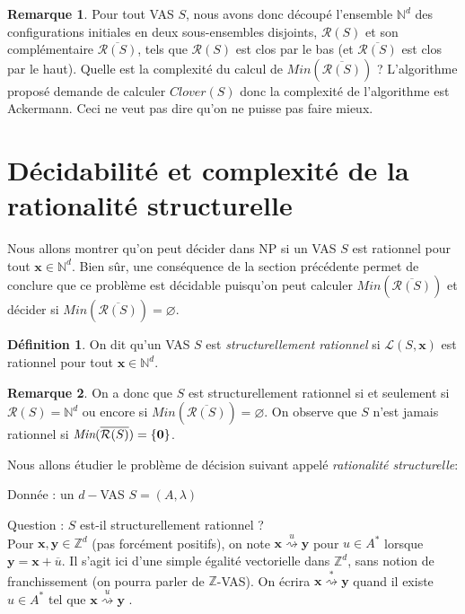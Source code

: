 \documentclass[a4paper,final]{article}
\theoremstyle{definition}
\newtheorem{Definition}[Theorem]{Définition}
\newtheorem*{Remark}{Remarque}
\newcommand{\os}[1]{\left\{\mathinner{#1}\right\}}
\let\vide\varnothing
\newcommand{\Min}{\textit{Min}}
\newcommand{\N}{\ensuremath{\mathbb{N}}}
\newcommand{\Z}{\ensuremath{\mathbb{Z}}}
\newcommand{\lang}{\ensuremath{\mathcal{L}}}
\newcommand{\clover}{\textit{Clover}}
\newcommand{\transZ}[1]{\ensuremath{\stackrel{#1}{\rightsquigarrow}}}
\newcommand{\vect}[1]{\ensuremath{\mathbf{#1}}}
\newcommand{\valeur}[1]{\ensuremath{\overline{#1}}}
\newcommand{\inirat}{\mathcal{R}}
\begin{document}
\begin{Remark}
Pour tout VAS $S$, nous avons donc découpé l'ensemble $\N^d$ des configurations initiales en deux sous-ensembles disjoints, $\inirat(S)$ et son complémentaire $\overline{\inirat(S)}$, tels que $\inirat(S)$ est clos par le bas (et $\overline{\inirat(S)}$ est clos par le haut).
Quelle est la complexité du calcul de $\Min(\overline{\inirat(S)})$ ? L'algorithme proposé demande de calculer $\clover(S)$ donc la complexité de l'algorithme est Ackermann. Ceci ne veut pas dire qu'on ne puisse pas faire mieux. 
\end{Remark}

\section{Décidabilité et complexité de la rationalité structurelle}

Nous allons montrer qu'on peut décider dans NP si un VAS $S$ est rationnel pour tout $\vect{x} \in \N^d$. Bien sûr, une conséquence de la section précédente permet de conclure que ce problème est décidable puisqu'on peut calculer $\Min(\overline{\inirat(S)})$ et décider si $\Min(\overline{\inirat(S)})=\vide$.

\begin{Definition}
On dit qu'un VAS $S$ est \emph{structurellement rationnel} si $\lang(S,\vect{x})$ est rationnel pour tout $\vect{x} \in \N^d$.
\end{Definition}

\begin{Remark}
On a donc que $S$ est structurellement rationnel si et seulement si $\inirat(S) = \N^d$ ou encore si
 $\Min(\overline{\inirat(S)})=\vide$. On observe que $S$ n'est jamais rationnel si $\Min(\overline{\inirat(S)})=\os{\vect{0}}$.  
\end{Remark}

Nous allons étudier le problème de décision suivant appelé \emph{rationalité structurelle}:

Donnée : un $d-$VAS $S=(A,\lambda)$

Question : $S$ est-il structurellement rationnel ? \\

Pour $\vect{x},\vect{y}\in\Z^d$ (pas forcément positifs), on note $\vect{x} \transZ{u} \vect{y}$ pour $u\in A^*$ lorsque $\vect{y} = \vect{x} + \valeur{u}$.
Il s'agit ici d'une simple égalité vectorielle dans $\Z^d$, sans notion de franchissement (on pourra parler de $\Z$-VAS).
On écrira $\vect{x} \transZ{*} \vect{y}$ quand il existe $u\in A^*$ tel que $\vect{x} \transZ{u} \vect{y}$ .
\end{document}
